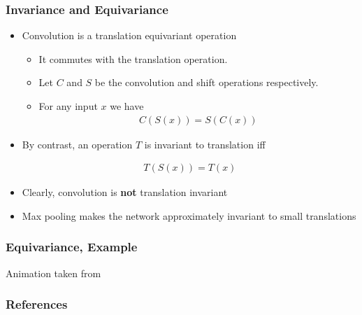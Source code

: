 \documentclass{beamer}
\begin{document}
\begin{frame}
    \frametitle{Invariance and Equivariance}
\begin{itemize}
    \item Convolution is a translation equivariant operation
    \begin{itemize}
        \item It commutes with the translation operation. 
        \item Let $C$ and $S$ be the convolution and shift operations respectively. 
        \item For any input $x$ we have
        \begin{align*}
            C(S(x))=S(C(x))
        \end{align*}
    \end{itemize}
    \item By contrast, an operation $T$ is invariant to translation iff
   
    \begin{align*}
        T(S(x))=T(x)
    \end{align*}
    \item Clearly, convolution is \textbf{not} translation invariant
    \item Max pooling makes the network approximately invariant to small translations
\end{itemize}
    

\end{frame}
  \begin{frame}
    \frametitle{Equivariance, Example}
    Animation taken from \href{https://chriswolfvision.medium.com/what-is-translation-equivariance-and-why-do-we-use-convolutions-to-get-it-6f18139d4c59}{} 
\vspace{1cm}

\end{frame}
\begin{frame}
    \frametitle{References}
\nocite{*}    
\printbibliography
\end{frame}
\end{document}

